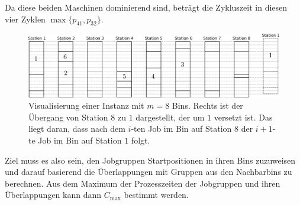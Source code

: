 \documentclass{scrreprt}
\begin{document}
Da diese beiden Maschinen dominierend sind, beträgt die Zykluszeit in diesen vier Zyklen $\max\{p_{41},p_{32}\}$.
\begin{figure}
    \begin{center}
        \includegraphics[width=\textwidth]{graphics/binfixbsp.pdf}
    \end{center}
    \caption{
        \label{abb:binfixbsp}
        Visualisierung einer Instanz mit $m=8$ Bins. 
        Rechts ist der Übergang von Station $8$ zu $1$ dargestellt, der um $1$ versetzt ist.
        Das liegt daran, dass nach dem $i$-ten Job im Bin auf Station $8$ der $i+1$-te Job im Bin auf Station $1$ folgt.
    }
\end{figure}

Ziel muss es also sein, den Jobgruppen Startpositionen in ihren Bins zuzuweisen und darauf basierend die Überlappungen mit Gruppen 
aus den Nachbarbins zu berechnen. 
Aus dem Maximum der Prozesszeiten der Jobgruppen und ihren Überlappungen kann dann $C_{\max}$ bestimmt werden.
\end{document}

